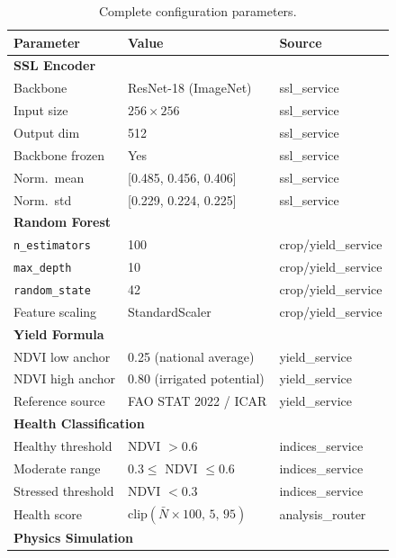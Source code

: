 \documentclass[12pt,a4paper,oneside]{report}
\begin{document}
\begin{table}[h]
\centering
\caption{Complete configuration parameters.}
\label{tab:config}
\begin{tabular}{lll}
\toprule
\textbf{Parameter} & \textbf{Value} & \textbf{Source} \\
\midrule
\multicolumn{3}{l}{\textbf{SSL Encoder}}\\
Backbone           & ResNet-18 (ImageNet)         & ssl\_service \\
Input size         & $256\times256$               & ssl\_service \\
Output dim         & 512                          & ssl\_service \\
Backbone frozen    & Yes                          & ssl\_service \\
Norm.\ mean        & [0.485, 0.456, 0.406]        & ssl\_service \\
Norm.\ std         & [0.229, 0.224, 0.225]        & ssl\_service \\[6pt]
\multicolumn{3}{l}{\textbf{Random Forest}}\\
\texttt{n\_estimators}   & 100             & crop/yield\_service \\
\texttt{max\_depth}      & 10              & crop/yield\_service \\
\texttt{random\_state}   & 42              & crop/yield\_service \\
Feature scaling          & StandardScaler  & crop/yield\_service \\[6pt]
\multicolumn{3}{l}{\textbf{Yield Formula}}\\
NDVI low anchor    & 0.25 (national average)      & yield\_service \\
NDVI high anchor   & 0.80 (irrigated potential)   & yield\_service \\
Reference source   & FAO STAT 2022 / ICAR         & yield\_service \\[6pt]
\multicolumn{3}{l}{\textbf{Health Classification}}\\
Healthy threshold  & NDVI $> 0.6$                 & indices\_service \\
Moderate range     & $0.3 \leq$ NDVI $\leq 0.6$  & indices\_service \\
Stressed threshold & NDVI $< 0.3$                 & indices\_service \\
Health score       & $\mathrm{clip}(\bar{N}\times100,\,5,\,95)$ & analysis\_router \\[6pt]
\multicolumn{3}{l}{\textbf{Physics Simulation}}\\

\end{tabular}
\end{table}
\end{document}
